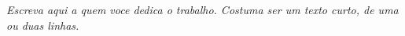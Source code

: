 
\begin{dedicatoria}
  \vspace*{\fill}
  \centering
  \noindent
  \textit{
    Escreva aqui a quem voce dedica o trabalho.
    Costuma ser um texto curto, de uma ou duas linhas.
  }
  \vspace*{\fill}
\end{dedicatoria}
